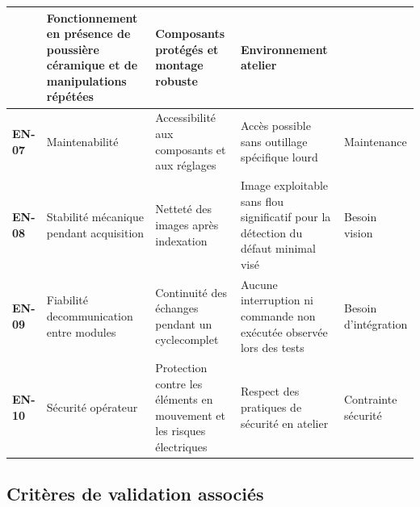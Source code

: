 \begin{longtable}{|p{1.3cm}|p{3.6cm}|p{4cm}|p{3.6cm}|p{2.5cm}|}
    & Fonctionnement en présence de poussière céramique et de manipulations répétées
    & Composants protégés et montage robuste
    & Environnement atelier \\ \hline
\textbf{EN-07} & Maintenabilité
    & Accessibilité aux composants et aux réglages
    & Accès possible sans outillage spécifique lourd
    & Maintenance \\ \hline
\textbf{EN-08} & Stabilité mécanique pendant acquisition
    & Netteté des images après indexation
    & Image exploitable sans flou significatif pour la détection du défaut minimal visé
    & Besoin vision \\ \hline
\textbf{EN-09} & Fiabilité de\newline communication entre modules
    & Continuité des échanges pendant un cycle\newline complet
    & Aucune interruption ni commande non exécutée observée lors des tests
    & Besoin d'intégration \\ \hline
\textbf{EN-10} & Sécurité opérateur
    & Protection contre les éléments en mouvement et les risques électriques
    & Respect des pratiques de sécurité en atelier
    & Contrainte sécurité \\ \hline
\end{longtable}

\subsection{Critères de validation associés}

